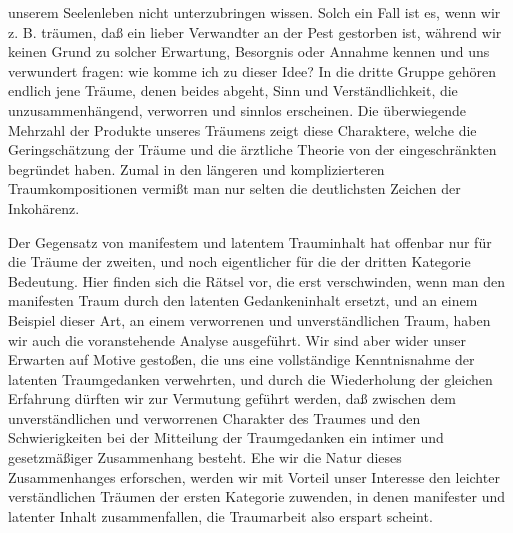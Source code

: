 \documentclass[twoside=true,titlepage=false,open=any, parskip=never, fontsize=10pt, headings=small, chapterprefix=false, appendixprefix=false]{scrbook}
\begin{document}
         
            
            
            
        \pstart
        unserem Seelenleben nicht unterzubringen wissen. Solch ein Fall ist
               es, wenn wir z. B. träumen, daß ein lieber Verwandter an der Pest gestorben ist,
               während wir keinen Grund zu solcher Erwartung, Besorgnis oder Annahme kennen und
               uns verwundert fragen: wie komme ich zu dieser Idee? In die dritte Gruppe
               gehören endlich jene Träume, denen beides abgeht, Sinn und Verständlichkeit, die
                  unzusammenhängend, verworren und sinnlos erscheinen. Die
               überwiegende Mehrzahl der Produkte unseres Träumens zeigt diese
               Charaktere, welche die Geringschätzung der Träume und die ärztliche
               Theorie von der eingeschränkten  begründet haben. Zumal in den längeren und komplizierteren
               Traumkompositionen vermißt man nur selten die deutlichsten Zeichen der
               Inkohärenz.
        \pend
    
            
        \pstart
        Der Gegensatz von manifestem und latentem Trauminhalt hat offenbar nur für die
               Träume der zweiten, und noch eigentlicher für die der dritten Kategorie
               Bedeutung. Hier finden sich die Rätsel vor, die erst verschwinden, wenn man den
               manifesten Traum durch den latenten Gedankeninhalt ersetzt, und an einem
               Beispiel dieser Art, an einem verworrenen und unverständlichen Traum, haben wir
               auch die voranstehende Analyse ausgeführt. Wir sind aber wider unser Erwarten
               auf Motive gestoßen, die uns eine vollständige Kenntnisnahme der latenten
               Traumgedanken verwehrten, und durch die Wiederholung der gleichen Erfahrung
               dürften wir zur Vermutung geführt werden, daß zwischen dem
                  unverständlichen und verworrenen Charakter des Traumes und den Schwierigkeiten bei der
                  Mitteilung der Traumgedanken ein intimer und gesetzmäßiger Zusammenhang
                  besteht. Ehe wir die Natur dieses Zusammenhanges erforschen, werden wir
               mit Vorteil unser Interesse den leichter verständlichen Träumen der ersten
               Kategorie zuwenden, in denen manifester und latenter Inhalt zusammenfallen, die
               Traumarbeit also erspart scheint.
        \pend
    
\end{document}
